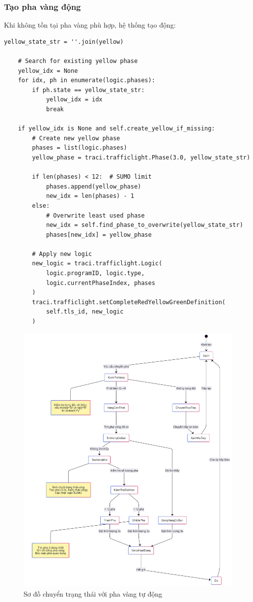 \subsubsection{Tạo pha vàng động}

Khi không tồn tại pha vàng phù hợp, hệ thống tạo động:

\begin{lstlisting}[style=py, caption={Dynamic yellow phase creation}]
    yellow_state_str = ''.join(yellow)
    
    # Search for existing yellow phase
    yellow_idx = None
    for idx, ph in enumerate(logic.phases):
        if ph.state == yellow_state_str:
            yellow_idx = idx
            break
    
    if yellow_idx is None and self.create_yellow_if_missing:
        # Create new yellow phase
        phases = list(logic.phases)
        yellow_phase = traci.trafficlight.Phase(3.0, yellow_state_str)
        
        if len(phases) < 12:  # SUMO limit
            phases.append(yellow_phase)
            new_idx = len(phases) - 1
        else:
            # Overwrite least used phase
            new_idx = self.find_phase_to_overwrite(yellow_state_str)
            phases[new_idx] = yellow_phase
            
        # Apply new logic
        new_logic = traci.trafficlight.Logic(
            logic.programID, logic.type, 
            logic.currentPhaseIndex, phases
        )
        traci.trafficlight.setCompleteRedYellowGreenDefinition(
            self.tls_id, new_logic
        )
\end{lstlisting}

\begin{figure}[H]
    \centering
    \includegraphics[width=0.75\linewidth]{Untitled diagram _ Mermaid Chart-2025-08-22-070255.png}
    \caption{Sơ đồ chuyển trạng thái với pha vàng tự động}
    \label{fig:placeholder}
\end{figure}

